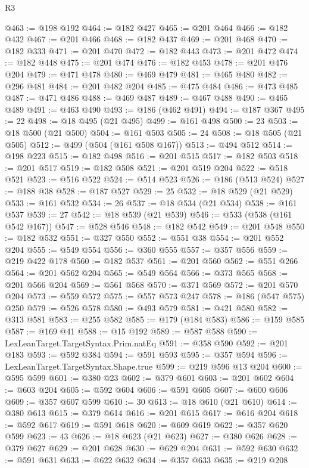 \begin{lexlean}{R3}
\begin{coremodule}
@463 := @198 @192
@464 := @182 @427
@465 := @201 @464
@466 := @182 @432
@467 := @201 @466
@468 := @182 @437
@469 := @201 @468
@470 := @182 @333
@471 := @201 @470
@472 := @182 @443
@473 := @201 @472
@474 := @182 @448
@475 := @201 @474
@476 := @182 @453
@478 := @201 @476 @204
@479 := @471 @478
@480 := @469 @479
@481 := @465 @480
@482 := @296 @481
@484 := @201 @482 @204
@485 := @475 @484
@486 := @473 @485
@487 := @471 @486
@488 := @469 @487
@489 := @467 @488
@490 := @465 @489
@491 := @463 @490
@493 := @186 (@462 @491)
@494 := @187 @367
@495 := 22
@498 := @18 @495 (@21 @495)
@499 := @161 @498
@500 := 23
@503 := @18 @500 (@21 @500)
@504 := @161 @503
@505 := 24
@508 := @18 @505 (@21 @505)
@512 := @499 (@504 (@161 @508 @167))
@513 := @494 @512
@514 := @198 @223
@515 := @182 @498
@516 := @201 @515
@517 := @182 @503
@518 := @201 @517
@519 := @182 @508
@521 := @201 @519 @204
@522 := @518 @521
@523 := @516 @522
@524 := @514 @523
@526 := @186 (@513 @524)
@527 := @188 @38
@528 := @187 @527
@529 := 25
@532 := @18 @529 (@21 @529)
@533 := @161 @532
@534 := 26
@537 := @18 @534 (@21 @534)
@538 := @161 @537
@539 := 27
@542 := @18 @539 (@21 @539)
@546 := @533 (@538 (@161 @542 @167))
@547 := @528 @546
@548 := @182 @542
@549 := @201 @548
@550 := @182 @532
@551 := @327 @550
@552 := @551 @38
@554 := @201 @552 @204
@555 := @549 @554
@556 := @360 @555
@557 := @357 @556
@559 := @219 @422 @178
@560 := @182 @537
@561 := @201 @560
@562 := @551 @266
@564 := @201 @562 @204
@565 := @549 @564
@566 := @373 @565
@568 := @201 @566 @204
@569 := @561 @568
@570 := @371 @569
@572 := @201 @570 @204
@573 := @559 @572
@575 := @557 @573 @247
@578 := @186 (@547 @575) @250
@579 := @526 @578
@580 := @493 @579
@581 := @421 @580
@582 := @313 @581
@583 := @255 @582
@585 := @179 (@184 @583)
@586 := @159 @585
@587 := @169 @41
@588 := @15 @192
@589 := @587 @588
@590 := LexLeanTarget.TargetSyntax.Prim.natEq
@591 := @358 @590
@592 := @201 @183
@593 := @592 @384
@594 := @591 @593
@595 := @357 @594
@596 := LexLeanTarget.TargetSyntax.Shape.true
@599 := @219 @596 @13 @204
@600 := @595 @599
@601 := @380 @23
@602 := @379 @601
@603 := @201 @602
@604 := @603 @204
@605 := @592 @604
@606 := @591 @605
@607 := @600 @606
@609 := @357 @607 @599
@610 := 30
@613 := @18 @610 (@21 @610)
@614 := @380 @613
@615 := @379 @614
@616 := @201 @615
@617 := @616 @204
@618 := @592 @617
@619 := @591 @618
@620 := @609 @619
@622 := @357 @620 @599
@623 := 43
@626 := @18 @623 (@21 @623)
@627 := @380 @626
@628 := @379 @627
@629 := @201 @628
@630 := @629 @204
@631 := @592 @630
@632 := @591 @631
@633 := @622 @632
@634 := @357 @633
@635 := @219 @208

\end{coremodule}
\end{lexlean}
